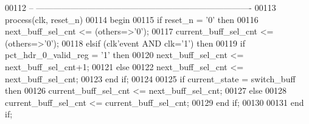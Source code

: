 \begin{DoxyCode}
00112 \textcolor{keyword}{-- ----------------------------------------------------------------------------}
00113 \textcolor{keywordflow}{process}(clk, reset_n)
00114 \textcolor{vhdlkeyword}{begin}
00115    \textcolor{keywordflow}{if} \textcolor{vhdlchar}{reset_n} \textcolor{vhdlchar}{=} \textcolor{vhdlchar}{'}\textcolor{vhdllogic}{}\textcolor{vhdllogic}{0}\textcolor{vhdlchar}{'} \textcolor{keywordflow}{then} 
00116       \textcolor{vhdlchar}{next_buff_sel_cnt} \textcolor{vhdlchar}{<=} \textcolor{vhdlchar}{(}\textcolor{keywordflow}{others}\textcolor{vhdlchar}{=}\textcolor{vhdlchar}{>}\textcolor{vhdlchar}{'}\textcolor{vhdllogic}{}\textcolor{vhdllogic}{0}\textcolor{vhdlchar}{'}\textcolor{vhdlchar}{)};
00117       \textcolor{vhdlchar}{current_buff_sel_cnt} \textcolor{vhdlchar}{<=} \textcolor{vhdlchar}{(}\textcolor{keywordflow}{others}\textcolor{vhdlchar}{=}\textcolor{vhdlchar}{>}\textcolor{vhdlchar}{'}\textcolor{vhdllogic}{}\textcolor{vhdllogic}{0}\textcolor{vhdlchar}{'}\textcolor{vhdlchar}{)};
00118    \textcolor{keywordflow}{elsif} \textcolor{vhdlchar}{(}\textcolor{vhdlchar}{clk}\textcolor{vhdlchar}{'}\textcolor{vhdlkeyword}{event} \textcolor{keywordflow}{AND} \textcolor{vhdlchar}{clk}\textcolor{vhdlchar}{=}\textcolor{vhdlchar}{'}\textcolor{vhdllogic}{}\textcolor{vhdllogic}{1}\textcolor{vhdlchar}{'}\textcolor{vhdlchar}{)} \textcolor{keywordflow}{then}
00119       \textcolor{keywordflow}{if} \textcolor{vhdlchar}{pct_hdr_0_valid_reg} \textcolor{vhdlchar}{=} \textcolor{vhdlchar}{'}\textcolor{vhdllogic}{}\textcolor{vhdllogic}{1}\textcolor{vhdlchar}{'} \textcolor{keywordflow}{then} 
00120          \textcolor{vhdlchar}{next_buff_sel_cnt} \textcolor{vhdlchar}{<=} \textcolor{vhdlchar}{next_buff_sel_cnt}\textcolor{vhdlchar}{+}\textcolor{vhdllogic}{}\textcolor{vhdllogic}{1};
00121       \textcolor{keywordflow}{else} 
00122          \textcolor{vhdlchar}{next_buff_sel_cnt} \textcolor{vhdlchar}{<=} \textcolor{vhdlchar}{next_buff_sel_cnt};
00123       \textcolor{keywordflow}{end} \textcolor{keywordflow}{if};
00124       
00125       \textcolor{keywordflow}{if} \textcolor{vhdlchar}{current_state} \textcolor{vhdlchar}{=} \textcolor{vhdlchar}{switch\_buff} \textcolor{keywordflow}{then} 
00126          \textcolor{vhdlchar}{current_buff_sel_cnt} \textcolor{vhdlchar}{<=} \textcolor{vhdlchar}{next_buff_sel_cnt};
00127       \textcolor{keywordflow}{else}
00128          \textcolor{vhdlchar}{current_buff_sel_cnt} \textcolor{vhdlchar}{<=} \textcolor{vhdlchar}{current_buff_sel_cnt};
00129       \textcolor{keywordflow}{end} \textcolor{keywordflow}{if};
00130       
00131    \textcolor{keywordflow}{end} \textcolor{keywordflow}{if};

\end{DoxyCode}
